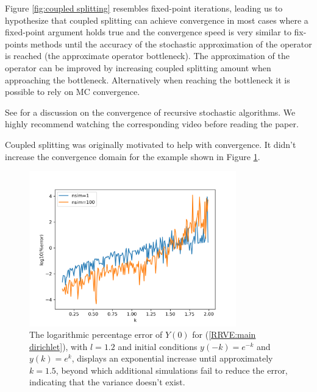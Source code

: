 \documentclass[a4paper,12pt]{article}
\begin{document}
Figure \ref{fig:coupled splitting}
resembles fixed-point iterations, leading us to hypothesize
that coupled splitting can achieve convergence in most cases
where a fixed-point argument holds true and the convergence
speed is very similar to fix-points methods until the accuracy
of the stochastic approximation of the operator is reached
(the approximate operator bottleneck). The approximation of the operator
can be improved by increasing coupled splitting amount when
approaching the bottleneck. Alternatively when reaching
the bottleneck it is possible to rely on MC convergence.

\begin{related}
    See \cite{gupta_convergence_2021} for a discussion on the convergence
    of recursive stochastic algorithms. We highly recommend watching
    the corresponding video \cite{abhishek_gupta_recursive_2020} before reading
    the paper.
\end{related}

Coupled splitting was originally motivated to help with
convergence. It didn't increase the convergence domain for
the example shown in Figure \ref{fig:mainD explosion}.\\

\begin{figure}[h!]
    \centering
    \includegraphics[width=0.8\textwidth]{plots/mainD explosion.png}
    \caption{The logarithmic percentage error of $Y(0)$ for
    (\ref{RRVE:main dirichlet}), with $l=1.2$ and initial conditions
    $y(-k)=e^{-k}$ and $y(k)=e^{k}$, displays an exponential
    increase until approximately $k=1.5$, beyond which additional
    simulations fail to reduce the error, indicating that the variance
    doesn't exist.}
    \label{fig:mainD explosion}
\end{figure}
\end{document}
